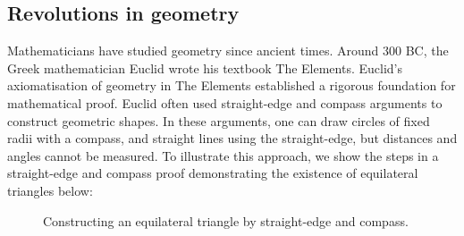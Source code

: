 \documentclass[12pt]{amsart}
\theoremstyle{plain}
\theoremstyle{definition}
\begin{document}
\subsection*{Revolutions in geometry}
Mathematicians have studied geometry since ancient times.
Around 300 BC, the Greek mathematician Euclid wrote his textbook The Elements.
Euclid's axiomatisation of geometry in The Elements established a rigorous foundation for mathematical proof.
Euclid often used straight-edge and compass arguments to construct geometric shapes.
In these arguments, one can draw circles of fixed radii with a compass, and straight lines using the straight-edge, but distances and angles cannot be measured.
To illustrate this approach, we show the steps in a straight-edge and compass proof demonstrating the existence of equilateral triangles below:
\begin{figure}[H]
\begin{center}
\begin{minipage}{0.22\textwidth} %
\end{minipage}%
\hfill %
\begin{minipage}{0.22\textwidth} %
\end{minipage}%
\hfill
\begin{minipage}{0.22\textwidth} %
\end{minipage}%
\hfill
\begin{minipage}{0.22\textwidth} %
\end{minipage}
\end{center}
\caption{Constructing an equilateral triangle by straight-edge and compass.}
\end{figure}
\end{document}
